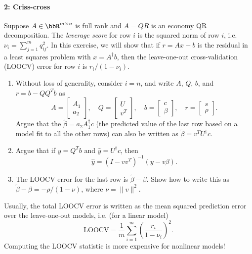 \documentclass[12pt, leqno]{article} %
\begin{document}
\paragraph*{2: Criss-cross}
Suppose $A \in \bbR^{m \times n}$ is full rank and $A = QR$ is an
economy QR decomposition.  The {\em leverage score} for
row $i$ is the squared norm of row $i$,
i.e.~$\nu_i = \sum_{j=1}^m q_{ij}^2$.  In this exercise, we will show
that if $r = Ax-b$ is the residual in a least squares problem with
$x = A^\dagger b$, then the leave-one-out cross-validation (LOOCV) error
for row $i$ is $r_i/(1-\nu_i)$.
\begin{enumerate}
\item Without loss of generality, consider $i = n$, and write
  $A$, $Q$, $b$, and $r = b-QQ^T b$ as
  \[
    A = \begin{bmatrix} A_1 \\ a_2 \end{bmatrix}, \quad
    Q = \begin{bmatrix} U \\ v^T \end{bmatrix}, \quad
    b = \begin{bmatrix} c \\ \beta \end{bmatrix}, \quad
    r = \begin{bmatrix} s \\ \rho \end{bmatrix}.
  \]
  Argue that the $\tilde{\beta} = a_2 A_1^\dagger c$
  (the predicted value of the last row based on a model fit to
  all the other rows) can also be written as
  $\tilde{\beta} = v^T U^\dagger c$.
\item Argue that if $y = Q^T b$ and $\hat{y} = U^\dagger c$, then
  \[
    \hat{y} = (I-vv^T)^{-1} (y-v\beta).
  \]
\item The LOOCV error for the last row is $\tilde{\beta} - \beta$.
  Show how to write this as $\tilde{\beta} - \beta = - \rho/(1-\nu)$,
  where $\nu = \|v\|^2$.
\end{enumerate}
Usually, the total LOOCV error is written as
the mean squared prediction error over the leave-one-out models, i.e.
(for a linear model)
\[
  \mathrm{LOOCV} =
  \frac{1}{m} \sum_{i=1}^m \left( \frac{r_i}{1-\nu_i} \right)^2.
\]
Computing the LOOCV statistic is more expensive for nonlinear models!
\end{document}

